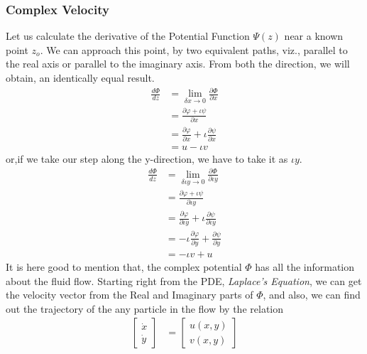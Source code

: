 \documentclass{book}
\begin{document}
\subsubsection{Complex Velocity}
Let us calculate the derivative of the Potential Function $\Psi(z)$ near a known point $z_o$. We can approach this point, by two equivalent paths, viz., parallel to the real axis or parallel to the imaginary axis. From both the direction, we will obtain, an identically equal result.\textemdash\\
\begin{equation*}
\begin{split}
\frac{d\Phi}{dz}&=\lim_{\delta x\to0}\frac{\partial \Phi}{\partial x}\\
&=\frac{\partial \varphi +\iota \psi}{\partial x}\\
&=\frac{\partial \varphi}{\partial x}+\iota\frac{\partial \psi}{\partial x}\\
&=u-\iota v
\end{split}
\end{equation*}
or,if we take our step along the y-direction, we have to take it as $\iota y$.
\begin{equation*}
\begin{split}
\frac{d\Phi}{dz}&=\lim_{\delta \iota y\to0}\frac{\partial \Phi}{\partial \iota y}\\
&=\frac{\partial \varphi +\iota \psi}{\partial \iota y}\\
&=\frac{\partial \varphi}{\partial \iota y}+\iota\frac{\partial \psi}{\partial \iota y}\\
&=-\iota\frac{\partial \varphi}{\partial  y}+\frac{\partial \psi}{\partial  y}\\
&=-\iota v + u
\end{split}
\end{equation*}
It is here good to mention that, the complex potential $\Phi$ has all the information about the fluid flow. Starting right from the PDE, \emph{Laplace's Equation}, we can get the velocity vector from the Real and Imaginary parts of $\Phi$, and also, we can find out the trajectory of the any particle in the flow by the relation \textemdash
\begin{equation*}
\begin{split}
\begin{bmatrix}\dot x\\[0.3cm]\dot y\end{bmatrix}&=\begin{bmatrix}u(x,y)\\[0.3cm]v(x,y)\end{bmatrix}\\
\end{split}
\end{equation*}
\end{document}
